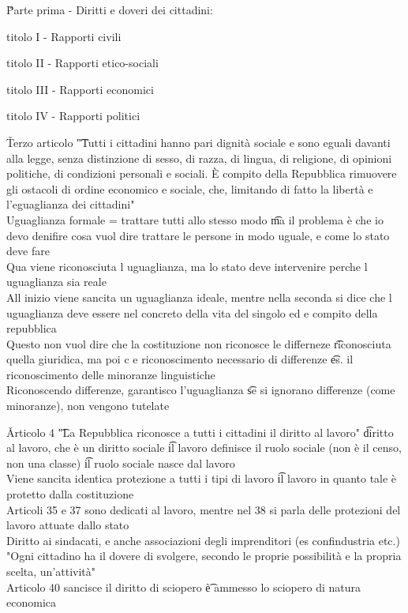 \documentclass[12pt]{article}
\begin{document}
\v

Parte prima - Diritti e doveri dei cittadini:
\bi
  \item titolo I - Rapporti civili
  \item titolo II - Rapporti etico-sociali
  \item titolo III - Rapporti economici
  \item titolo IV - Rapporti politici
\ei

\v

Terzo articolo \t "Tutti i cittadini hanno pari dignità sociale e sono eguali davanti alla legge, senza distinzione di sesso, di razza, di lingua, di religione, di opinioni politiche, di condizioni personali e sociali. È compito della Repubblica rimuovere gli ostacoli di ordine economico e sociale, che, limitando di fatto la libertà e l'eguaglianza dei cittadini" \\
Uguaglianza formale = trattare tutti allo stesso modo \t ma il problema è che io devo denifire cosa vuol dire trattare le persone in modo uguale, e come lo stato deve fare \\
Qua viene riconosciuta l uguaglianza, ma lo stato deve intervenire perche l uguaglianza sia reale \\
All inizio viene sancita un uguaglianza ideale, mentre nella seconda si dice che l uguaglianza deve essere nel concreto della vita del singolo ed e compito della repubblica \\
Questo non vuol dire che la costituzione non riconosce le differneze \t riconosciuta quella giuridica, ma poi c e riconoscimento necessario di differenze \t es. il riconoscimento delle minoranze linguistiche \\
Riconoscendo differenze, garantisco l'uguaglianza \t se si ignorano differenze (come minoranze), non vengono tutelate

\v

Articolo 4 \t "La Repubblica riconosce a tutti i cittadini il diritto al lavoro" \t diritto al lavoro, che è un diritto sociale \t il lavoro definisce il ruolo sociale (non è il censo, non una classe) \t il ruolo sociale nasce dal lavoro \\
Viene sancita identica protezione a tutti i tipi di lavoro \t il lavoro in quanto tale è protetto dalla costituzione \\
Articoli 35 e 37 sono dedicati al lavoro, mentre nel 38 si parla delle protezioni del lavoro attuate dallo stato \\
Diritto ai sindacati, e anche associazioni degli imprenditori (es confindustria etc.) \\
"Ogni cittadino ha il dovere di svolgere, secondo le proprie possibilità e la propria scelta, un'attività" \\
Articolo 40 sancisce il diritto di sciopero \t è ammesso lo sciopero di natura economica
\end{document}
